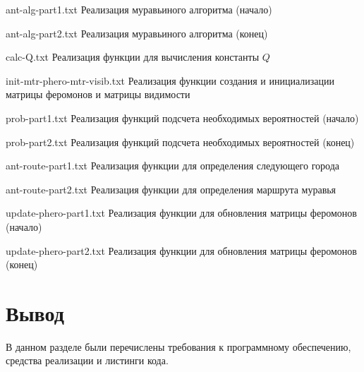 {ant-alg-part1.txt} %
{Реализация муравьиного алгоритма (начало)} %

\clearpage

{ant-alg-part2.txt} %
{Реализация муравьиного алгоритма (конец)} %

{calc-Q.txt} %
{Реализация функции для вычисления константы $Q$} %

{init-mtr-phero-mtr-visib.txt} %
{Реализация функции создания и инициализации матрицы феромонов и матрицы видимости} %

{prob-part1.txt} %
{Реализация функций подсчета необходимых вероятностей (начало)} %

\clearpage

{prob-part2.txt} %
{Реализация функций подсчета необходимых вероятностей (конец)} %

{ant-route-part1.txt} %
{Реализация функции для определения следующего города} %

\clearpage

{ant-route-part2.txt} %
{Реализация функции для определения маршрута муравья} %

{update-phero-part1.txt} %
{Реализация функции для обновления матрицы феромонов (начало)} %

{update-phero-part2.txt} %
{Реализация функции для обновления матрицы феромонов (конец)} %

\section*{Вывод}

В данном разделе были перечислены требования к программному обеспечению, средства реализации и листинги кода.

    